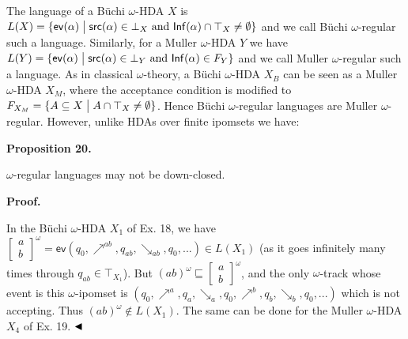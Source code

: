 The language of a Büchi $\omega$-HDA $X$ is $L(X)={\{\mathsf{ev}(\alpha)\mathrel{\big{|}}\mathsf{src}(\alpha)\in\bot_{X}\text{ and }\mathsf{Inf}(\alpha)\cap\top_{X}\neq\emptyset\}}$ and we call Büchi $\omega$-regular such a language. Similarly, for a Muller $\omega$-HDA $Y$ we have ${L(Y)={\{\mathsf{ev}(\alpha)\mathrel{\big{|}}\mathsf{src}(\alpha)\in\bot_{Y}\text{ and }\mathsf{Inf}(\alpha)\in F_{Y}\}}}$ and we call Muller $\omega$-regular such a language. As in classical $\omega$-theory, a Büchi $\omega$-HDA $X_{B}$ can be seen as a Muller $\omega$-HDA $X_{M}$, where the acceptance condition is modified to $F_{X_{M}}={\{A\subseteq X\mathrel{\big{|}}A\cap\top_{X}\neq\emptyset\}}$. Hence Büchi $\omega$-regular languages are Muller $\omega$-regular. However, unlike HDAs over finite ipomsets we have:\par
 
 
 
\par\medskip\noindent\textbf{Proposition 20.}\par
 
 
$\omega$-regular languages may not be down-closed.\par
 
 
 
 
\par\medskip\noindent\textbf{Proof.}\par
 
 
In the Büchi $\omega$-HDA $X_{1}$ of Ex. 18, we have $\left[\begin{smallmatrix}a\\
b\end{smallmatrix}\right]^{\omega}=\mathsf{ev}(q_{0},\mathrel{\nearrow^{ab}},q_{ab},\mathrel{\searrow_{ab}},q_{0},...)\in L(X_{1})$ (as it goes infinitely many times through $q_{ab}\in\top_{X_{1}}$). But $(ab)^{\omega}\sqsubseteq\left[\begin{smallmatrix}a\\
b\end{smallmatrix}\right]^{\omega}$, and the only $\omega$-track whose event is this $\omega$-ipomset is $(q_{0},\mathrel{\nearrow^{a}},q_{a},\mathrel{\searrow_{a}},q_{0},\mathrel{\nearrow^{b}},q_{b},\mathrel{\searrow_{b}},q_{0},...)$ which is not accepting. Thus $(ab)^{\omega}\not\in L(X_{1})$. The same can be done for the Muller $\omega$-HDA $X_{4}$ of Ex. 19. $\hfill\blacktriangleleft$\par
 
